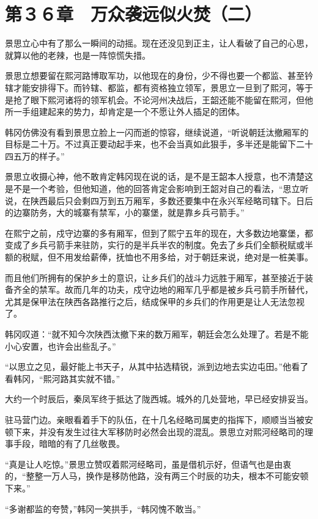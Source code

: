\section{第３６章　万众袭远似火焚（二）}

景思立心中有了那么一瞬间的动摇。现在还没见到正主，让人看破了自己的心思，就算以他的老辣，也是一阵惊慌失措。

景思立想要留在熙河路博取军功，以他现在的身份，少不得也要一个都监、甚至钤辖才能安排得下。而钤辖、都监，都有资格独立领军，景思立一旦到了熙河，等于是抢了眼下熙河诸将的领军机会。不论河州决战后，王韶还能不能留在熙河，但他所一手组建起来的势力，却肯定是一个不愿让外人插足的团体。

韩冈仿佛没有看到景思立脸上一闪而逝的惊容，继续说道，“听说朝廷汰撤厢军的目标是二十万。不过真正要动起手来，也不会当真如此狠手，多半还是能留下二十四五万的样子。”

景思立收摄心神，他不敢肯定韩冈现在说的话，是不是王韶本人授意，也不清楚这是不是一个考验，但他知道，他的回答肯定会影响到王韶对自己的看法，“思立听说，在陕西最后只会剩四万到五万厢军，多数还要集中在永兴军经略司辖下。日后的边寨防务，大的城寨有禁军，小的寨堡，就是靠乡兵弓箭手。”

在熙宁之前，戍守边寨的多有厢军，但到了熙宁五年的现在，大多数边地寨堡，都变成了乡兵弓箭手来驻防，实行的是半兵半农的制度。免去了乡兵们全额税赋或半额的税赋，但不用发给薪俸，抚恤也不用多给，对于朝廷来说，绝对是一桩美事。

而且他们所拥有的保护乡土的意识，让乡兵们的战斗力远胜于厢军，甚至接近于装备齐全的禁军。故而几年的功夫，戍守边地的厢军几乎都是被乡兵弓箭手所替代，尤其是保甲法在陕西各路推行之后，结成保甲的乡兵们的作用更是让人无法忽视了。

韩冈叹道：“就不知今次陕西汰撤下来的数万厢军，朝廷会怎么处理了。若是不能小心安置，也许会出些乱子。”

“以思立之见，最好能上书天子，从其中拈选精锐，派到边地去实边屯田。”他看了看韩冈，“熙河路其实就不错。”

大约一个时辰后，秦凤军终于抵达了陇西城。城外的几处营地，早已经安排妥当。

驻马营门边。亲眼看着手下的队伍，在十几名经略司属吏的指挥下，顺顺当当被安顿下来，并没有发生过往大军移防时必然会出现的混乱。景思立对熙河经略司的理事手段，暗暗的有了几丝敬畏。

“真是让人吃惊。”景思立赞叹着熙河经略司，虽是借机示好，但语气也是由衷的，“整整一万人马，换作是移防他路，没有两三个时辰的功夫，根本不可能安顿下来。”

“多谢都监的夸赞，”韩冈一笑拱手，“韩冈愧不敢当。”

